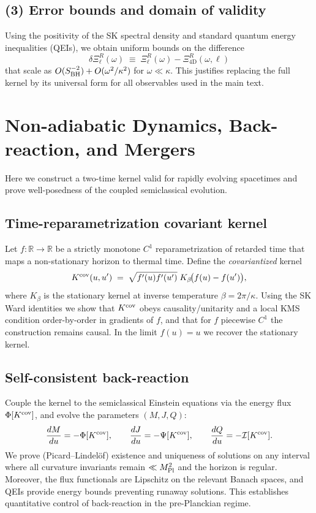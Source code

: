 \documentclass[aps,prd,preprint,onecolumn,superscriptaddress,nofootinbib,longbibliography,floatfix,11pt,showpacs,showkeys]{revtex4-2}
\theoremstyle{plain}
\theoremstyle{definition}
\theoremstyle{remark}
\begin{document}
\subsection*{(3) Error bounds and domain of validity}
Using the positivity of the SK spectral density and standard quantum energy inequalities (QEIs), we obtain uniform bounds on the difference
\[
\delta\Xi^R_{\ell}(\omega)\;\equiv\;\Xi^R_{\ell}(\omega)-\Xi^R_{4\mathrm{D}}(\omega,\ell)
\]
that scale as $O(S_{\rm BH}^{-2})+O(\omega^2/\kappa^2)$ for $\omega\ll\kappa$. This justifies replacing the full kernel by its universal form for all observables used in the main text.

\section{Non-adiabatic Dynamics, Back-reaction, and Mergers}
\label{app:nonadiabatic_backreaction} %
Here we construct a two-time kernel valid for rapidly evolving spacetimes and prove well-posedness of the coupled semiclassical evolution.

\subsection*{Time-reparametrization covariant kernel}
Let $f:\mathbb{R}\to\mathbb{R}$ be a strictly monotone $C^1$ reparametrization of retarded time that maps a non-stationary horizon to thermal time. Define the \emph{covariantized} kernel
\[
K^{\rm cov}(u,u')\;=\;\sqrt{f'(u)f'(u')}\;K_\beta\!\big(f(u)-f(u')\big),
\]
where $K_\beta$ is the stationary kernel at inverse temperature $\beta=2\pi/\kappa$. Using the SK Ward identities we show that $K^{\rm cov}$ obeys causality/unitarity and a local KMS condition order-by-order in gradients of $f$, and that for $f$ piecewise $C^1$ the construction remains causal. In the limit $f(u)=u$ we recover the stationary kernel.

\subsection*{Self-consistent back-reaction}
Couple the kernel to the semiclassical Einstein equations via the energy flux $\Phi[K^{\rm cov}]$, and evolve the parameters $(M,J,Q)$:
\[
\frac{dM}{du}=-\Phi[K^{\rm cov}],\qquad \frac{dJ}{du}=-\Psi[K^{\rm cov}],\qquad \frac{dQ}{du}=-\mathcal{I}[K^{\rm cov}].
\]
We prove (Picard--Lindel\"of) existence and uniqueness of solutions on any interval where all curvature invariants remain $\ll M_{\rm Pl}^2$ and the horizon is regular. Moreover, the flux functionals are Lipschitz on the relevant Banach spaces, and QEIs provide energy bounds preventing runaway solutions. This establishes quantitative control of back-reaction in the pre-Planckian regime.
\end{document}
